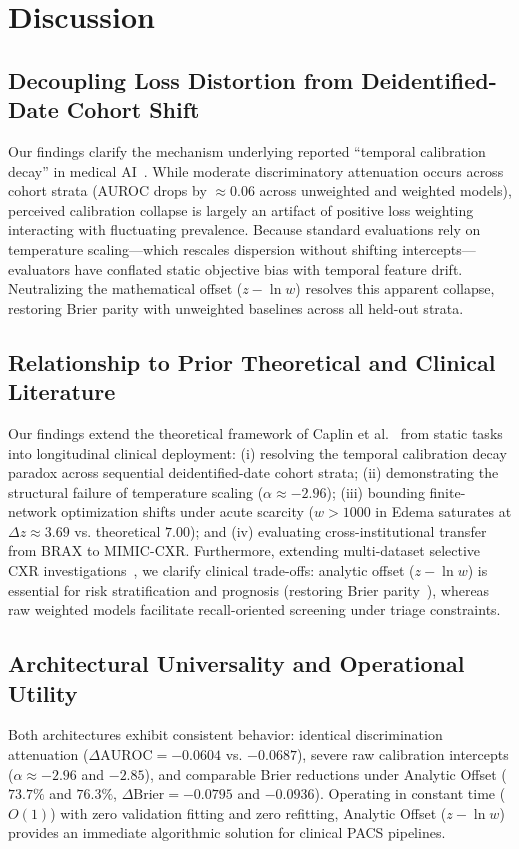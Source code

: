 \documentclass[preprint,12pt]{elsarticle}
\begin{document}
\section{Discussion}

\subsection{Decoupling Loss Distortion from Deidentified-Date Cohort Shift}
Our findings clarify the mechanism underlying reported ``temporal calibration decay'' in medical AI~\cite{guo2022evaluation, hinson2022multisite}. While moderate discriminatory attenuation occurs across cohort strata (AUROC drops by $\approx 0.06$ across unweighted and weighted models), perceived calibration collapse is largely an artifact of positive loss weighting interacting with fluctuating prevalence. Because standard evaluations rely on temperature scaling---which rescales dispersion without shifting intercepts---evaluators have conflated static objective bias with temporal feature drift. Neutralizing the mathematical offset ($z - \ln w$) resolves this apparent collapse, restoring Brier parity with unweighted baselines across all held-out strata.

\subsection{Relationship to Prior Theoretical and Clinical Literature}
Our findings extend the theoretical framework of Caplin et al.~\cite{caplin2022calibrating} from static tasks into longitudinal clinical deployment: (i) resolving the temporal calibration decay paradox across sequential deidentified-date cohort strata; (ii) demonstrating the structural failure of temperature scaling ($\alpha \approx -2.96$); (iii) bounding finite-network optimization shifts under acute scarcity ($w > 1000$ in Edema saturates at $\Delta z \approx 3.69$ vs. theoretical $7.00$); and (iv) evaluating cross-institutional transfer from BRAX to MIMIC-CXR. Furthermore, extending multi-dataset selective CXR investigations~\cite{aperstein2026knowing}, we clarify clinical trade-offs: analytic offset ($z - \ln w$) is essential for risk stratification and prognosis (restoring Brier parity~\cite{piccininni2024understanding}), whereas raw weighted models facilitate recall-oriented screening under triage constraints.

\subsection{Architectural Universality and Operational Utility}
Both architectures exhibit consistent behavior: identical discrimination attenuation ($\Delta\text{AUROC} = -0.0604$ vs. $-0.0687$), severe raw calibration intercepts ($\alpha \approx -2.96$ and $-2.85$), and comparable Brier reductions under Analytic Offset ($73.7\%$ and $76.3\%$, $\Delta\text{Brier} = -0.0795$ and $-0.0936$). Operating in constant time ($O(1)$) with zero validation fitting and zero refitting, Analytic Offset ($z - \ln w$) provides an immediate algorithmic solution for clinical PACS pipelines.
\end{document}
